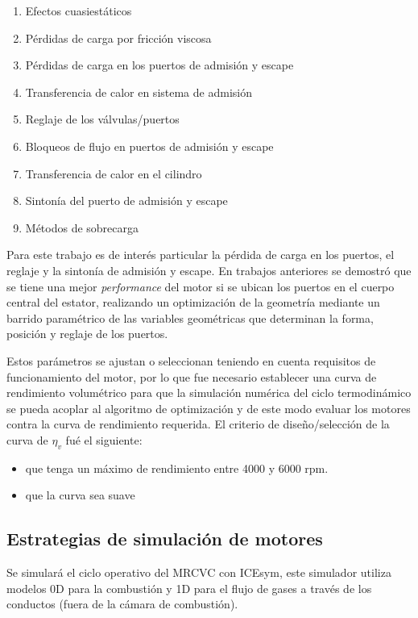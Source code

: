 \begin{enumerate}
    \item Efectos cuasiestáticos
    \item Pérdidas de carga por fricción viscosa
    \item Pérdidas de carga en los puertos de admisión y escape
    \item Transferencia de calor en sistema de admisión
    \item Reglaje de los válvulas/puertos
    \item Bloqueos de flujo en puertos de admisión y escape
    \item Transferencia de calor en el cilindro
    \item Sintonía del puerto de admisión y escape
    \item Métodos de sobrecarga 
\end{enumerate}

Para este trabajo es de interés particular la pérdida de carga en los puertos,
el reglaje y la sintonía de admisión y escape.
%
En trabajos anteriores \cite{lopez13} se demostró que se tiene una mejor
\emph{performance} del motor si se ubican los puertos en el cuerpo central del
estator, realizando un optimización de la geometría mediante un barrido
paramétrico de las variables geométricas que determinan la forma, posición y
reglaje de los puertos.
%

Estos parámetros se ajustan o seleccionan teniendo en cuenta requisitos de
funcionamiento del motor, por lo que fue necesario establecer una curva de
rendimiento volumétrico para que la simulación numérica del
ciclo termodinámico se pueda acoplar al algoritmo de optimización y de este
modo evaluar los motores contra la curva de rendimiento requerida.
%
El criterio de diseño/selección de la curva de $\eta_v$ fué el siguiente:

\begin{itemize}
  \item que tenga un máximo de rendimiento entre 4000 y 6000 rpm.
  \item que la curva sea suave
\end{itemize}

\subsection{Estrategias de simulación de motores}
%
Se simulará el ciclo operativo del MRCVC con ICEsym, este simulador utiliza
modelos 0D para la combustión y 1D para el flujo de gases a través de los
conductos (fuera de la cámara de combustión).

